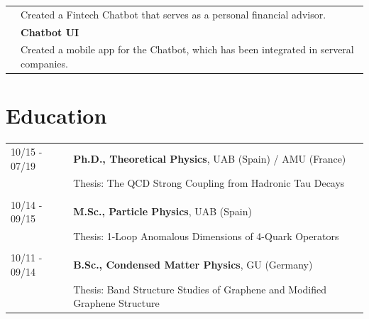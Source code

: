 \documentclass[11pt]{article}
\begin{document}
\begin{minipage}[t]{0.65\textwidth}
\begin{tabularx}{\textwidth}{lX}
                & \small Created a Fintech Chatbot that serves as a personal financial
                  advisor.\\
                & \small \textbf{Chatbot UI} \\
                & \small Created a mobile app for the Chatbot, which has been
                  integrated in serveral companies.
\end{tabularx}

\vspace{0.3cm}

\section*{Education}
\begin{small}
\begin{tabularx}{\textwidth}{lX}
  10/15 - 07/19 & \textbf{Ph.D., Theoretical Physics}, UAB (Spain) / AMU (France) \\
                & Thesis: The QCD Strong Coupling from Hadronic Tau
                  Decays \\\\
  10/14 - 09/15 & \textbf{M.Sc., Particle Physics}, UAB (Spain) \\
                & Thesis: 1-Loop Anomalous Dimensions of 4-Quark
                  Operators \\\\
  10/11 - 09/14 & \textbf{B.Sc., Condensed Matter Physics}, GU (Germany) \\
                & Thesis: Band Structure Studies of Graphene and Modified
                  Graphene Structure
\end{tabularx}
\end{small}


\end{minipage}
\end{document}
